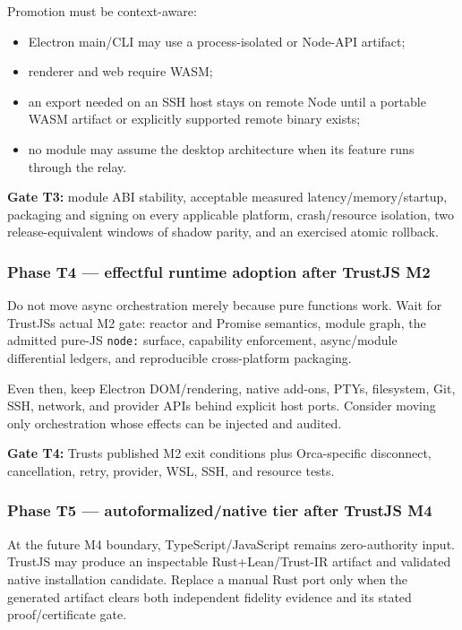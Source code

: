 \documentclass[
  10pt,
  letterpaper,
]{article}
\providecommand{\tightlist}{%
  \setlength{\itemsep}{0pt}\setlength{\parskip}{0pt}}
\begin{document}
Promotion must be context-aware:

\begin{itemize}
\tightlist
\item
  Electron main/CLI may use a process-isolated or Node-API artifact;
\item
  renderer and web require WASM;
\item
  an export needed on an SSH host stays on remote Node until a portable
  WASM artifact or explicitly supported remote binary exists;
\item
  no module may assume the desktop architecture when its feature runs
  through the relay.
\end{itemize}

\textbf{Gate T3:} module ABI stability, acceptable measured
latency/memory/startup, packaging and signing on every applicable
platform, crash/resource isolation, two release-equivalent windows of
shadow parity, and an exercised atomic rollback.

\subsubsection{Phase T4 --- effectful runtime adoption after TrustJS
M2}\label{phase-t4--effectful-runtime-adoption-after-trustjs-m2}

Do not move async orchestration merely because pure functions work. Wait
for TrustJS\textquotesingle s actual M2 gate: reactor and Promise
semantics, module graph, the admitted pure-JS \texttt{node:} surface,
capability enforcement, async/module differential ledgers, and
reproducible cross-platform packaging.

Even then, keep Electron DOM/rendering, native add-ons, PTYs,
filesystem, Git, SSH, network, and provider APIs behind explicit host
ports. Consider moving only orchestration whose effects can be injected
and audited.

\textbf{Gate T4:} Trust\textquotesingle s published M2 exit conditions
plus Orca-specific disconnect, cancellation, retry, provider, WSL, SSH,
and resource tests.

\subsubsection{Phase T5 --- autoformalized/native tier after TrustJS
M4}\label{phase-t5--autoformalizednative-tier-after-trustjs-m4}

At the future M4 boundary, TypeScript/JavaScript remains zero-authority
input. TrustJS may produce an inspectable Rust+Lean/Trust-IR artifact
and validated native installation candidate. Replace a manual Rust port
only when the generated artifact clears both independent fidelity
evidence and its stated proof/certificate gate.
\end{document}
